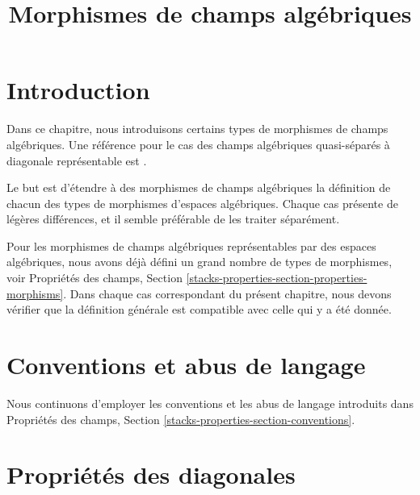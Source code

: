 

%


\title{Morphismes de champs algébriques}


\maketitle

\label{section-phantom}

\tableofcontents

\section{Introduction}
\label{section-introduction}

\noindent
Dans ce chapitre, nous introduisons certains types de morphismes de champs
algébriques. Une référence pour le cas des champs algébriques quasi-séparés à
diagonale représentable est \cite{LM-B}.

\medskip\noindent
Le but est d'étendre à des morphismes de champs algébriques la définition de
chacun des types de morphismes d'espaces algébriques. Chaque cas présente de
légères différences, et il semble préférable de les traiter séparément.

\medskip\noindent
Pour les morphismes de champs algébriques représentables par des espaces
algébriques, nous avons déjà défini un grand nombre de types de morphismes, voir
Propriétés des champs,
Section \ref{stacks-properties-section-properties-morphisms}.
Dans chaque cas correspondant du présent chapitre, nous devons vérifier que la
définition générale est compatible avec celle qui y a été donnée.




\section{Conventions et abus de langage}
\label{section-conventions}

\noindent
Nous continuons d'employer les conventions et les abus de langage introduits
dans Propriétés des champs, Section
\ref{stacks-properties-section-conventions}.




\section{Propriétés des diagonales}
\label{section-diagonals}


